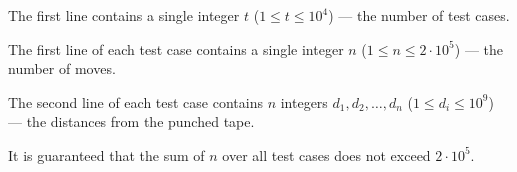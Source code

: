 The first line contains a single integer $t$ ($1 \le t \le 10^4$) --- the number of test cases.

The first line of each test case contains a single integer $n$ ($1 \le n \le 2 \cdot 10^5$) --- the number of moves.

The second line of each test case contains $n$ integers $d_1, d_2, \ldots, d_n$ ($1 \le d_i \le 10^9$) --- the distances from the punched tape.

It is guaranteed that the sum of $n$ over all test cases does not exceed $2 \cdot 10^5$.
